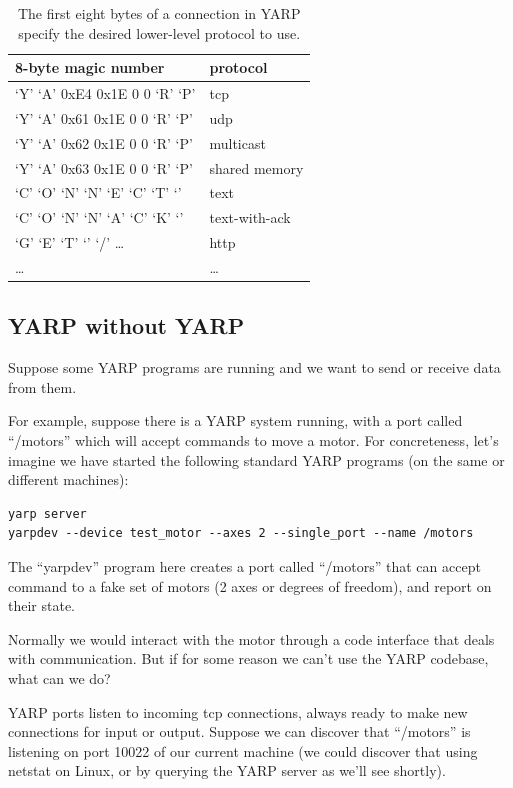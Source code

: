 \begin{table}
\begin{center}
\begin{tabular}{ll}
\hline
\hline
{\bf 8-byte magic number}&{\bf protocol} \\\hline
`Y' `A' 0xE4 0x1E 0 0 `R' `P'&tcp \\
`Y' `A' 0x61 0x1E 0 0 `R' `P'&udp\\
`Y' `A' 0x62 0x1E 0 0 `R' `P'&multicast\\
`Y' `A' 0x63 0x1E 0 0 `R' `P'&shared memory\\
`C' `O' `N' `N' `E' `C' `T' `\textvisiblespace' &text \\
`C' `O' `N' `N' `A' `C' `K' `\textvisiblespace' &text-with-ack \\
`G' `E' `T' `\textvisiblespace' `/' \ldots &http\\
  \ldots & \ldots\\\hline\hline
\end{tabular}
\end{center}
\caption{
%
The first eight bytes of a connection in YARP specify the
desired lower-level protocol to use.
%
}
\end{table}

\subsection{YARP without YARP}

Suppose some YARP programs are running and we want to send or
receive data from them.

For example, suppose there is a YARP system running, with a 
port called ``/motors'' which will accept commands to move a
motor.  For concreteness, let's imagine we have started the
following standard YARP programs (on the same or different 
machines):

\begin{verbatim}
yarp server
yarpdev --device test_motor --axes 2 --single_port --name /motors
\end{verbatim}

The ``yarpdev'' program here creates a port called ``/motors'' that can
accept command to a fake set of motors (2 axes or degrees of freedom),
and report on their state.

Normally we would interact with the motor through a code
interface that deals with communication.  But if for 
some reason we can't use the YARP codebase, what can
we do?

YARP ports listen to incoming tcp connections, always ready to make
new connections for input or output.  Suppose we can discover that
``/motors'' is listening on port 10022 of our current machine (we could
discover that using netstat on Linux, or by querying the YARP server
as we'll see shortly).

